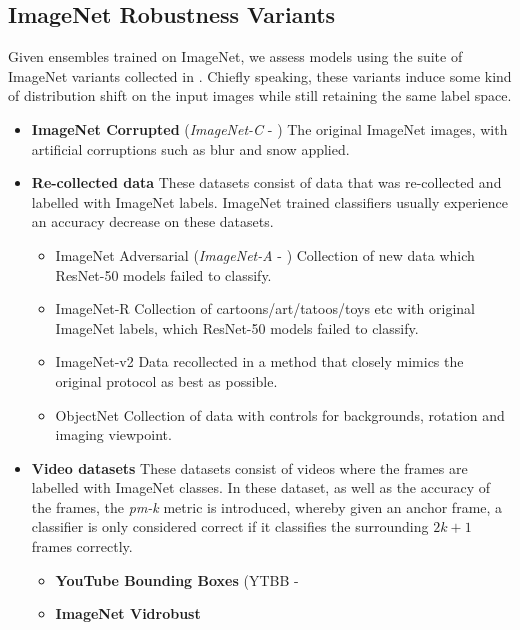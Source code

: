 \documentclass{article} \usepackage{iclr2021_conference,times}
\begin{document}
\subsection{ImageNet Robustness Variants}
\label{app:imagenet}
Given ensembles trained on ImageNet, we assess models using the suite of ImageNet variants collected in \citet{djolonga2020robustness}. Chiefly speaking, these variants induce some kind of distribution shift on the input images while still retaining the same label space.
\begin{itemize}
    \item \textbf{ImageNet Corrupted} (\textit{ImageNet-C} - \citep{imagenet_c})
    The original ImageNet images, with artificial corruptions such as blur and snow applied.
    \item \textbf{Re-collected data}
    These datasets consist of data that was re-collected and labelled with ImageNet labels. ImageNet trained classifiers usually experience an accuracy decrease on these datasets.
    \begin{itemize}
        \item ImageNet Adversarial (\textit{ImageNet-A} - \citep{imagenet_a})
        Collection of new data which ResNet-50 models failed to classify.
        \item ImageNet-R \citep{imagenet_r}
        Collection of cartoons/art/tatoos/toys etc with original ImageNet labels, which ResNet-50 models failed to classify.
        \item ImageNet-v2 \citep{imagenet_v2}
        Data recollected in a method that closely mimics the original protocol as best as possible.
        \item ObjectNet \citep{objectnet}
        Collection of data with controls for backgrounds, rotation and imaging viewpoint. 
    \end{itemize}
    \item \textbf{Video datasets}
    These datasets consist of videos where the frames are labelled with ImageNet classes. In these dataset, as well as the accuracy of the frames, the \textit{pm-k} metric is introduced, whereby given an anchor frame, a classifier is only considered correct if it classifies the surrounding $2k + 1$ frames correctly.
    \begin{itemize}
        \item \textbf{YouTube Bounding Boxes} (YTBB - \citep{ytbb, shankar2019image}
        \item \textbf{ImageNet Vidrobust} \citep{deng2009imagenet, shankar2019image}
    \end{itemize}
\end{itemize} 
\end{document}
